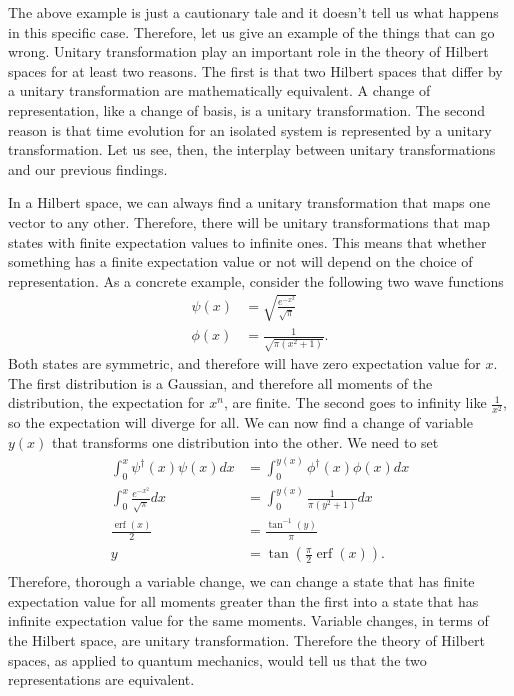 \documentclass[10pt,twocolumn, nofootinbib]{revtex4-2}
\DeclareMathOperator{\erf}{erf}
\begin{document}
The above example is just a cautionary tale and it doesn't tell us what happens in this specific case. Therefore, let us give an example of the things that can go wrong. Unitary transformation play an important role in the theory of Hilbert spaces for at least two reasons. The first is that two Hilbert spaces that differ by a unitary transformation are mathematically equivalent. A change of representation, like a change of basis, is a unitary transformation. The second reason is that time evolution for an isolated system is represented by a unitary transformation. Let us see, then, the interplay between unitary transformations and our previous findings.

In a Hilbert space, we can always find a unitary transformation that maps one vector to any other. Therefore, there will be unitary transformations that map states with finite expectation values to infinite ones. This means that whether something has a finite expectation value or not will depend on the choice of representation. As a concrete example, consider the following two wave functions
\begin{align}
	\psi(x) &= \sqrt{\frac{e^{-x^2}}{\sqrt{\pi}}} \\
	\phi(x) &= \frac{1}{\sqrt{\pi(x^2 + 1)}}.
\end{align}
Both states are symmetric, and therefore will have zero expectation value for $x$. The first distribution is a Gaussian, and therefore all moments of the distribution, the expectation for $x^n$, are finite. The second goes to infinity like $\frac{1}{x^2}$, so the expectation will diverge for all. We can now find a change of variable $y(x)$ that transforms one distribution into the other. We need to set
\begin{equation}
	\begin{aligned}
	\int_{0}^{x} \psi^\dagger(x) \psi(x) dx &= \int_{0}^{y(x)} \phi^\dagger(x) \phi(x) dx \\
	\int_{0}^{x} \frac{e^{-x^2}}{\sqrt{\pi}} dx &= \int_{0}^{y(x)} \frac{1}{\pi(y^2 + 1)} dx \\
	\frac{\erf(x)}{2} &= \frac{\tan^{-1}(y)}{\pi} \\
	y &= \tan \left(\frac{\pi}{2}\erf(x)\right). \\
	\end{aligned}
\end{equation}
Therefore, thorough a variable change, we can change a state that has finite expectation value for all moments greater than the first into a state that has infinite expectation value for the same moments. Variable changes, in terms of the Hilbert space, are unitary transformation. Therefore the theory of Hilbert spaces, as applied to quantum mechanics, would tell us that the two representations are equivalent.
\end{document}
